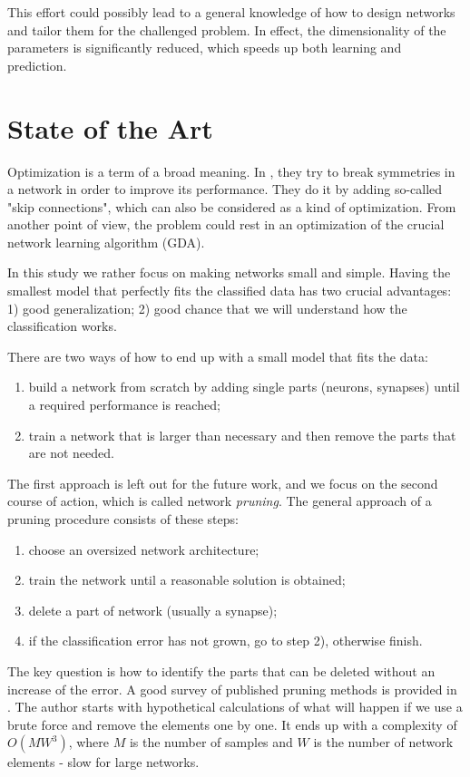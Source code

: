 This effort could possibly lead to a general knowledge of how to design networks and tailor them for the challenged problem. In effect, the dimensionality of the parameters is significantly reduced, which speeds up both learning and prediction.

\section{State of the Art} \label{sec:state_of_the_art}
Optimization is a term of a broad meaning. In \citep{orhan:symmetry}, they try to break symmetries in a network in order to improve its performance. They do it by adding so-called "skip connections", which can also be considered as a kind of optimization. From another point of view, the problem could rest in an optimization of the crucial network learning algorithm (GDA).

In this study we rather focus on making networks small and simple. Having the smallest model that perfectly fits the classified data has two crucial advantages: 1) good generalization; 2) good chance that we will understand how the classification works.

There are two ways of how to end up with a small model that fits the data:

\begin{enumerate}
\item build a network from scratch by adding single parts (neurons, synapses) until a required performance is reached;
\item train a network that is larger than necessary and then remove the parts that are not needed.
\end{enumerate}

The first approach is left out for the future work, and we focus on the second course of action, which is called network \textit{pruning}. The general approach of a pruning procedure consists of these steps:

\begin{enumerate}
\item choose an oversized network architecture;
\item train the network until a reasonable solution is obtained;
\item delete a part of network (usually a synapse);
\item if the classification error has not grown, go to step 2), otherwise finish.
\end{enumerate}

The key question is how to identify the parts that can be deleted without an increase of the error. A good survey of published pruning methods is provided in \citep{reed:pa_survey}. The author starts with hypothetical calculations of what will happen if we use a brute force and remove the elements one by one. It ends up with a complexity of $ O(MW^3) $, where $ M $ is the number of samples and $ W $ is the number of network elements - slow for large networks. 

